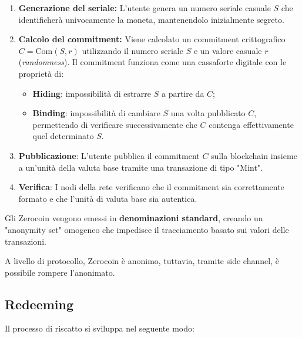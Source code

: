 \begin{enumerate}
    \item \textbf{Generazione del seriale:} L'utente genera un numero seriale casuale $S$ che identificherà univocamente la moneta, mantenendolo inizialmente segreto.
    \item \textbf{Calcolo del commitment:} Viene calcolato un commitment crittografico $C = \text{Com}(S, r)$ utilizzando il numero seriale $S$ e un valore casuale $r$ (\textit{randomness}). Il commitment funziona come una cassaforte digitale con le proprietà di:
    \begin{itemize}
        \item \textbf{Hiding}: impossibilità di estrarre $S$ a partire da $C$;
        \item \textbf{Binding}: impossibilità di cambiare $S$ una volta pubblicato $C$, permettendo di verificare successivamente che $C$ contenga effettivamente quel determinato $S$.
    \end{itemize}
    \item \textbf{Pubblicazione}: L'utente pubblica il commitment $C$ sulla blockchain insieme a un'unità della valuta base tramite una transazione di tipo "Mint".
    \item \textbf{Verifica}: I nodi della rete verificano che il commitment sia correttamente formato e che l'unità di valuta base sia autentica.
\end{enumerate}

Gli Zerocoin vengono emessi in \textbf{denominazioni standard}, creando un "anonymity set" omogeneo che impedisce il tracciamento basato sui valori delle transazioni.

A livello di protocollo, Zerocoin è anonimo, tuttavia, tramite side channel, è possibile rompere l'anonimato.


\subsection{Redeeming}
Il processo di riscatto si sviluppa nel seguente modo:


